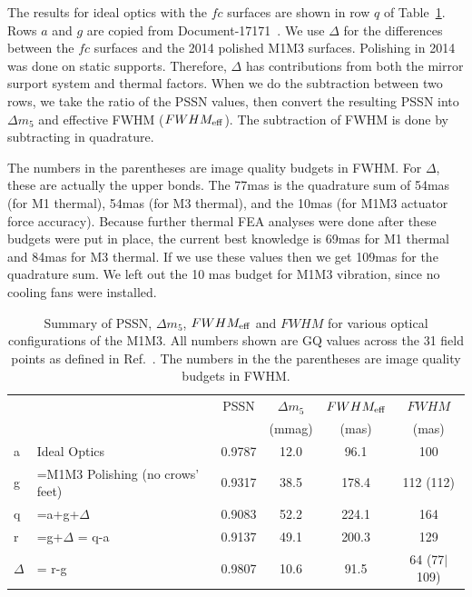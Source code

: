 \documentclass [twoside,openbib,12pt]{article}
\begin{document}
The results for ideal optics with the $fc$ surfaces are shown in row
$q$ of Table~\ref{tab:fwhm}.
Rows $a$ and $g$ are copied from Document-17171~\cite{m1m3perf}.
We use $\Delta$ for the differences between the $fc$ surfaces and the
2014 polished M1M3 surfaces.
Polishing in 2014 was done on static supports.
Therefore, $\Delta$ has contributions from both the mirror surport
system and thermal factors.
When we do the subtraction between two rows, we take the ratio of the
PSSN values, then convert the resulting PSSN into $\Delta m_5$ and
effective FWHM ($FWHM_{\rm eff}$). 
The subtraction of FWHM is done by subtracting in quadrature.

The numbers in the parentheses are image quality budgets in FWHM.
For $\Delta$, these are actually the upper bonds.
The 77mas is the quadrature sum of 54mas (for M1 thermal), 54mas (for
M3 thermal), and the 10mas (for M1M3 actuator force accuracy).
Because further thermal FEA analyses were done after these budgets
were put in place, the current best knowledge is 69mas for M1 thermal
and 84mas for M3 thermal.
If we use these values then we get 109mas for the quadrature sum.
We left out the 10 mas budget for M1M3 vibration, since no cooling
    fans were installed.
    
\begin{table}[bpt]
\caption{Summary of PSSN,  $\Delta m_5$,  $FWHM_{\rm eff}$ and $FWHM$ for various
optical configurations of the M1M3. 
All numbers shown are GQ values across the 
31 field points as defined in Ref.~\cite{m1m3perf}.
The numbers in the the parentheses are image quality budgets in FWHM.}
\vspace{1mm} \centering
\begin{tabular}{ll|cccc }\hline\hline
&& PSSN & $\Delta m_5$& $FWHM_{\rm eff}$ & $FWHM$ \\
& &  & (mmag)&(mas) &(mas)  \\\hline\hline
a&Ideal Optics &0.9787 & 12.0 & 96.1   & 100    \\
g&=M1M3 Polishing (no crows' feet) &0.9317  & 38.5 & 178.4 & 112 (112)  \\
q&=a+g+$\Delta$ & 0.9083  & 52.2  & 224.1 & 164 \\ \hline
  r& =g+$\Delta$ = q-a & 0.9137 & 49.1 & 200.3 & 129 \\
  $\Delta$ & = r-g & 0.9807 & 10.6 & 91.5 & 64 (77$|$109) \\
\hline
\hline
\end{tabular}
\label{tab:fwhm}
\end{table}
\end{document}
